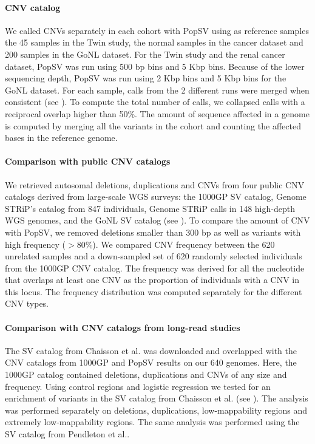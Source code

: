 \paragraph{CNV catalog}
We called CNVs separately in each cohort with {\sf PopSV} using as reference samples the 45 samples in the Twin study, the normal samples in the cancer dataset and 200 samples in the GoNL dataset.
For the Twin study and the renal cancer dataset, {\sf PopSV} was run using 500 bp bins and 5 Kbp bins.
Because of the lower sequencing depth, {\sf PopSV} was run using 2 Kbp bins and 5 Kbp bins for the GoNL dataset.
For each sample, calls from the 2 different runs were merged when consistent (see ).
To compute the total number of calls, we collapsed calls with a reciprocal overlap higher than 50\%.
The amount of sequence affected in a genome is computed by merging all the variants in the cohort and counting the affected bases in the reference genome.

\paragraph{Comparison with public CNV catalogs}
We retrieved autosomal deletions, duplications and CNVs from four public CNV catalogs derived from large-scale WGS surveys: the 1000GP SV catalog\cite{Sudmant2015a}, {\sf Genome STRiP}'s catalog from 847 individuals\cite{Handsaker2015}, {\sf Genome STRiP} calls in 148 high-depth WGS genomes\cite{Chiang2017}, and the GoNL SV catalog\cite{Francioli2014} (see ).
To compare the amount of CNV with {\sf PopSV}, we removed deletions smaller than 300 bp as well as variants with high frequency ($>80\%$).
We compared CNV frequency between the 620 unrelated samples and a down-sampled set of 620 randomly selected individuals from the 1000GP CNV catalog.
The frequency was derived for all the nucleotide that overlaps at least one CNV as the proportion of individuals with a CNV in this locus.
The frequency distribution was computed separately for the different CNV types.

\paragraph{Comparison with CNV catalogs from long-read studies}
The SV catalog from Chaisson et al.\cite{Chaisson2014} was downloaded and overlapped with the CNV catalogs from 1000GP and {\sf PopSV} results on our 640 genomes.
Here, the 1000GP catalog contained deletions, duplications and CNVs of any size and frequency.
Using control regions and logistic regression we tested for an enrichment of variants in the SV catalog from Chaisson et al.\cite{Chaisson2014} (see ).
The analysis was performed separately on deletions, duplications, low-mappability regions and extremely low-mappability regions.
The same analysis was performed using the SV catalog from Pendleton et al.\cite{Pendleton2015}.

